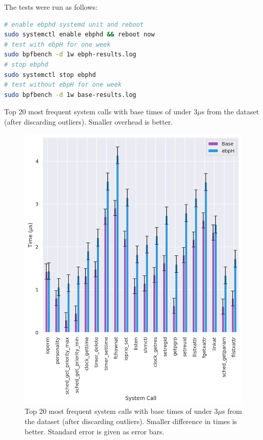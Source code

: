 \documentclass[
  12pt]{findlay}
\begin{document}
The tests were run as follows:

\begin{lstlisting}[language=sh]
# enable ebphd systemd unit and reboot
sudo systemctl enable ebphd && reboot now
# test with ebpH for one week
sudo bpfbench -d 1w ebph-results.log
# stop ebphd
sudo systemctl stop ebphd
# test without ebpH for one week
sudo bpfbench -d 1w base-results.log
\end{lstlisting}

\begin{table}
    \caption{Top 20 most frequent system calls with base times of under 3$\mu$s from the 
    dataset (after discarding outliers). Smaller overhead is better.}
    \label{bronte_7day}
    
\end{table}

\begin{figure}
\centering
\includegraphics{../data/bench/bronte-7day/under_3us_times.png}
\caption{\label{bronte_lmbench_syscall_graph}Top 20 most frequent system
calls with base times of under 3\(\mu\)s from the 
dataset (after discarding outliers). Smaller difference in times is
better. Standard error is given as error bars.}
\end{figure}
\end{document}
